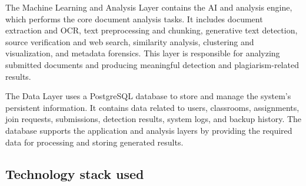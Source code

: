 \documentclass[12pt, a4paper]{report}
\numberwithin{equation}{chapter}
\begin{document}
The Machine Learning and Analysis Layer contains the AI and analysis engine, which performs the core document analysis tasks. It includes document extraction and OCR, text preprocessing and chunking, generative text detection, source verification and web search, similarity analysis, clustering and visualization, and metadata forensics. This layer is responsible for analyzing submitted documents and producing meaningful detection and plagiarism-related results.

The Data Layer uses a PostgreSQL database to store and manage the system's persistent information. It contains data related to users, classrooms, assignments, join requests, submissions, detection results, system logs, and backup history. The database supports the application and analysis layers by providing the required data for processing and storing generated results.

\subsection{Technology stack used}
\end{document}
